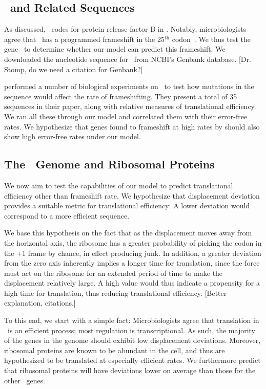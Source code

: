 \documentclass[12pt, draft]{article}
\numberwithin{equation}{section}
\begin{document}
\subsection{\prfB\ and Related Sequences}
As discussed, \prfB\ codes for protein release factor B in \ecoli.
Notably, microbiologists agree that \prfB\ has a programmed frameshift
in the 25$^\textrm{th}$ codon~\cite{weiss87}.  We thus test the
gene \prfB\ to determine whether our model can predict this
frameshift.  We downloaded the nucleotide sequence for \prfB\ from
NCBI's Genbank database.  [Dr. Stomp, do we need a citation for Genbank?]

\citet{weiss87} performed a number of biological experiments on
\prfB\ to test how mutations in the sequence would affect the rate of
frameshifting.  They present a total of 35 sequences in their paper,
along with relative measures of translational efficiency.  We ran all
these through our model and correlated them with their error-free rates.
We hypothesize that genes found to frameshift at high rates by
\citeauthor{weiss87} should also show high error-free rates under
our model.

\subsection{The \ecoli\ Genome and Ribosomal Proteins}
We now aim to test the capabilities of our model to predict translational
efficiency other than frameshift rate.  We hypothesize that displacement
deviation provides a suitable metric for translational efficiency:  A lower
deviation would correspond to a more efficient sequence.  

We base this 
hypothesis on the fact that as the displacement moves away from the 
horizontal axis, the ribosome has a greater probability of picking the
codon in the +1 frame by chance, in effect producing junk.  In addition,
a greater deviation from the zero axis inherently implies a longer
time for translation, since the force must act on the ribosome for an 
extended period of time to make the displacement relatively large.  A
high value would thus indicate a propensity for a high time for translation,
thus reducing translational efficiency.  [Better explanation, citations.]

To this end, we start with a simple fact:
Microbiologists agree that translation in \ecoli\ is an efficient process;
most regulation is transcriptional.  As such, the majority of the genes 
in the genome should exhibit low displacement deviations.  Moreover,
ribosomal proteins are known to be abundant in the cell, and thus
are hypothesized to be translated at especially efficient rates.  We
furthermore predict that ribosomal proteins will have deviations lower
on average than those for the other \ecoli\ genes.
\end{document}

